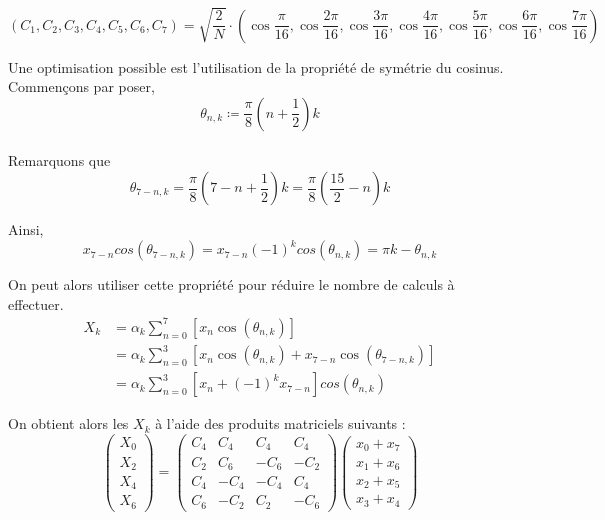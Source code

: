 $$(C_1, C_2, C_3, C_4, C_5, C_6, C_7)
=\sqrt{\frac{2}{N}} \cdot\left(\cos\frac{\pi}{16}, \cos\frac{2\pi}{16}, \cos\frac{3\pi}{16}, \cos\frac{4\pi}{16},
 \cos\frac{5\pi}{16}, \cos\frac{6\pi}{16}, \cos\frac{7\pi}{16}\right)$$

Une optimisation possible est l'utilisation de la propriété de symétrie du cosinus. Commençons par poser, 
$$ \theta_{n,k} \coloneq \frac{\pi}{8}(n+\frac{1}{2})k $$ \\
Remarquons que  $$\theta_{7-n,k} = \frac{\pi}{8}(7-n+\frac{1}{2})k = \frac{\pi}{8}(\frac{15}{2}-n)k $$

Ainsi,
$$x_{7-n}cos(\theta_{7-n,k}) = x_{7-n}(-1)^kcos(\theta_{n,k}) = \pi k- \theta_{n,k} $$

On peut alors utiliser cette propriété pour réduire le nombre de calculs à effectuer.
\begin{align*}
    X_k &= \alpha_k\sum_{n=0}^7[x_n\cos(\theta_{n,k})]\\
    &= \alpha_k\sum_{n=0}^3[x_n\cos(\theta_{n,k})+x_{7-n}\cos(\theta_{7-n,k})] \\
    &= \alpha_k\sum_{n=0}^3[x_n+(-1)^kx_{7-n}]cos(\theta_{n,k})
\end{align*}


On obtient alors les $X_k$ à l'aide des produits matriciels suivants : 
$$\begin{pmatrix} X_0 \\ X_2 \\ X_4 \\ X_6 \end{pmatrix}
=
\begin{pmatrix}
C_4 & C_4 & C_4 & C_4 \\
C_2 & C_6 & -C_6 & -C_2 \\
C_4 & -C_4 & -C_4 & C_4 \\
C_6 & -C_2 & C_2 & -C_6
\end{pmatrix}
\begin{pmatrix} x_0 + x_7 \\ x_1 + x_6 \\ x_2 + x_5 \\ x_3 + x_4 \end{pmatrix}$$

